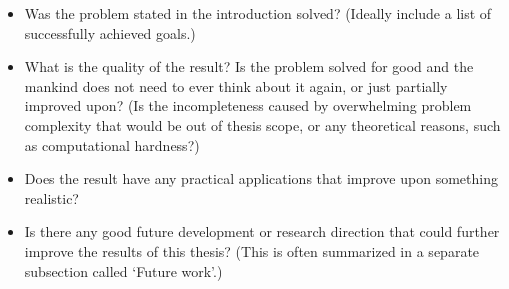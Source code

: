 
\begin{itemize}
\item Was the problem stated in the introduction solved? (Ideally include a list of successfully achieved goals.)
\item What is the quality of the result?
Is the problem solved for good and the mankind does not need to ever think about it again, or just partially improved upon? (Is the incompleteness caused by overwhelming problem complexity that would be out of thesis scope, or any theoretical reasons, such as computational hardness?)
\item Does the result have any practical applications that improve upon something realistic?
\item Is there any good future development or research direction that could further improve the results of this thesis? (This is often summarized in a separate subsection called `Future work'.)
\end{itemize}
